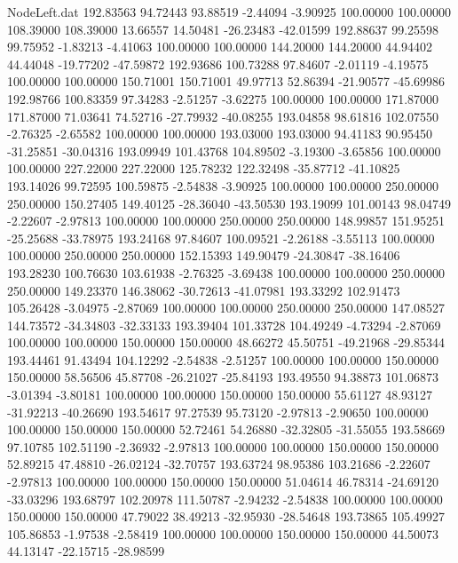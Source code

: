 \begin{filecontents}{NodeLeft.dat}
 192.83563   94.72443   93.88519    -2.44094   -3.90925  100.00000  100.00000  108.39000  108.39000   13.66557   14.50481  -26.23483  -42.01599
 192.88637   99.25598   99.75952    -1.83213   -4.41063  100.00000  100.00000  144.20000  144.20000   44.94402   44.44048  -19.77202  -47.59872
 192.93686  100.73288   97.84607    -2.01119   -4.19575  100.00000  100.00000  150.71001  150.71001   49.97713   52.86394  -21.90577  -45.69986
 192.98766  100.83359   97.34283    -2.51257   -3.62275  100.00000  100.00000  171.87000  171.87000   71.03641   74.52716  -27.79932  -40.08255
 193.04858   98.61816  102.07550    -2.76325   -2.65582  100.00000  100.00000  193.03000  193.03000   94.41183   90.95450  -31.25851  -30.04316
 193.09949  101.43768  104.89502    -3.19300   -3.65856  100.00000  100.00000  227.22000  227.22000  125.78232  122.32498  -35.87712  -41.10825
 193.14026   99.72595  100.59875    -2.54838   -3.90925  100.00000  100.00000  250.00000  250.00000  150.27405  149.40125  -28.36040  -43.50530
 193.19099  101.00143   98.04749    -2.22607   -2.97813  100.00000  100.00000  250.00000  250.00000  148.99857  151.95251  -25.25688  -33.78975
 193.24168   97.84607  100.09521    -2.26188   -3.55113  100.00000  100.00000  250.00000  250.00000  152.15393  149.90479  -24.30847  -38.16406
 193.28230  100.76630  103.61938    -2.76325   -3.69438  100.00000  100.00000  250.00000  250.00000  149.23370  146.38062  -30.72613  -41.07981
 193.33292  102.91473  105.26428    -3.04975   -2.87069  100.00000  100.00000  250.00000  250.00000  147.08527  144.73572  -34.34803  -32.33133
 193.39404  101.33728  104.49249    -4.73294   -2.87069  100.00000  100.00000  150.00000  150.00000   48.66272   45.50751  -49.21968  -29.85344
 193.44461   91.43494  104.12292    -2.54838   -2.51257  100.00000  100.00000  150.00000  150.00000   58.56506   45.87708  -26.21027  -25.84193
 193.49550   94.38873  101.06873    -3.01394   -3.80181  100.00000  100.00000  150.00000  150.00000   55.61127   48.93127  -31.92213  -40.26690
 193.54617   97.27539   95.73120    -2.97813   -2.90650  100.00000  100.00000  150.00000  150.00000   52.72461   54.26880  -32.32805  -31.55055
 193.58669   97.10785  102.51190    -2.36932   -2.97813  100.00000  100.00000  150.00000  150.00000   52.89215   47.48810  -26.02124  -32.70757
 193.63724   98.95386  103.21686    -2.22607   -2.97813  100.00000  100.00000  150.00000  150.00000   51.04614   46.78314  -24.69120  -33.03296
 193.68797  102.20978  111.50787    -2.94232   -2.54838  100.00000  100.00000  150.00000  150.00000   47.79022   38.49213  -32.95930  -28.54648
 193.73865  105.49927  105.86853    -1.97538   -2.58419  100.00000  100.00000  150.00000  150.00000   44.50073   44.13147  -22.15715  -28.98599

\end{filecontents}

